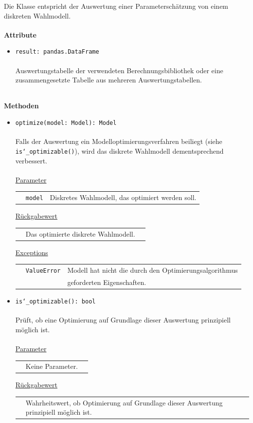 \documentclass{article}
\begin{document}
Die Klasse entspricht der Auswertung einer Parameterschätzung von einem diskreten Wahlmodell.
\\\\

\textbf{Attribute}
\begin{itemize}\setlength\itemsep{3em}
\item \texttt{result: pandas.DataFrame}\\\\
Auswertungstabelle der verwendeten Berechnungsbibliothek oder eine zusammengesetzte Tabelle aus mehreren Auswertungstabellen.
\\\\
\end{itemize}

\textbf{Methoden}
\begin{itemize}\setlength\itemsep{3em}
\item \texttt{optimize(model: Model): Model}\\\\
Falls der Auswertung ein Modelloptimierungsverfahren beiliegt (siehe \texttt{is\char`_optimizable()}), wird das diskrete Wahlmodell dementsprechend verbessert.\\\\
\underline{Parameter}\\
\begin{tabular}{lll}
 & \texttt{model} & Diskretes Wahlmodell, das optimiert werden soll.\\
\end{tabular}

\underline{Rückgabewert}\\
\begin{tabular}{lll}
 & Das optimierte diskrete Wahlmodell.\\
\end{tabular}

\underline{Exceptions}\\
\begin{tabular}{lll}
 & \texttt{ValueError} & Modell hat nicht die durch den Optimierungsalgorithmus\\
 && geforderten Eigenschaften.\\
\end{tabular}

\item \texttt{is\char`_optimizable(): bool}\\\\
Prüft, ob eine Optimierung auf Grundlage dieser Auswertung prinzipiell möglich ist.\\\\
\underline{Parameter}\\
\begin{tabular}{lll}
 & Keine Parameter.
\end{tabular}

\underline{Rückgabewert}\\
\begin{tabular}{lll}
 & Wahrheitswert, ob Optimierung auf Grundlage dieser Auswertung prinzipiell möglich ist.\\
\end{tabular}
\end{itemize}
\end{document}
